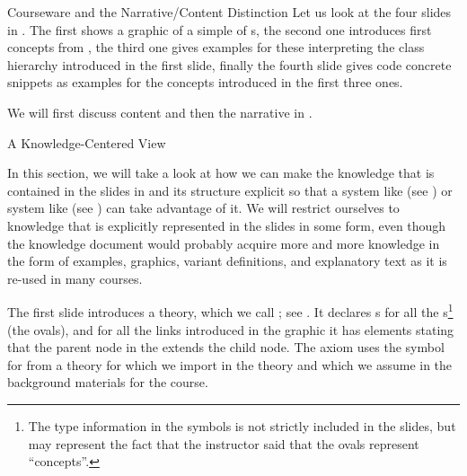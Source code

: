 \begin{tchapter}[id=courseware]{Courseware and the Narrative/Content Distinction}
Let us look at the four slides in {}. The first
{} shows a graphic of a simple {} of
{s}, the second one introduces first concepts from
{}, the
third one gives examples for these interpreting the class hierarchy introduced in
the first slide, finally the fourth slide gives code concrete snippets as examples
for the concepts introduced in the first three ones.

We will first discuss content {\omdoc} and then the narrative {\omdoc} in
{}.

\begin{tsection}[id=knowledge-centered]{A Knowledge-Centered View}
  
  In this section, we will take a look at how we can make the knowledge that is contained
  in the slides in {} and its structure explicit so that a
  {} system like {\mbase} (see {}) or
  {} system like {\activemath} (see
  {}) can take advantage of it. We will restrict ourselves to
  knowledge that is explicitly represented in the slides in some form, even though the
  knowledge document would probably acquire more and more knowledge in the form of
  examples, graphics, variant definitions, and explanatory text as it is re-used in many
  courses.

The first slide introduces a theory, which we call {}; see
{}.  It declares {s} for all the
{s}\footnote{The type information in the symbols is not strictly
  included in the slides, but may represent the fact that the instructor said that
  the ovals represent ``concepts''.}  (the ovals), and for all the links
introduced in the graphic it has {} elements stating that the
parent node in the {} extends the child node. The axiom uses the
symbol for {} from a theory {} for
{} which we import in the theory and which we
assume in the background materials for the course.


\end{tsection}
\end{tchapter}
